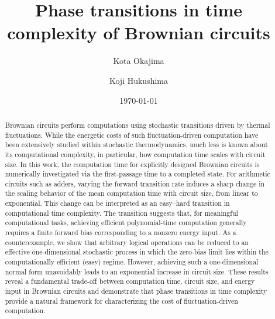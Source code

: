 \documentclass[%
 reprint,
superscriptaddress,
 amsmath,amssymb,
 aps,
 prx,
]{revtex4-2}
\begin{document}

\title{Phase transitions in time complexity of Brownian circuits}

\author{Kota Okajima}
\address{
 Graduate School of Arts and Sciences,
 The University of Tokyo,
 Komaba, Meguro-ku, Tokyo 153-8902, Japan
}

\author{Koji Hukushima}
\address{
 Graduate School of Arts and Sciences,
 The University of Tokyo,
 Komaba, Meguro-ku, Tokyo 153-8902, Japan
}
\address{
Komaba Institute for Science, The
University of Tokyo, 3-8-1 Komaba, Meguro-ku, Tokyo 153-8902, Japan
}

\date{\today}%

\begin{abstract}
Brownian circuits perform computations using stochastic transitions driven by thermal fluctuations. While the energetic costs of such fluctuation-driven computation have been extensively studied within stochastic thermodynamics, much less is known about its computational complexity, in particular, how computation time scales with circuit size. 
In this work, the computation time for explicitly designed Brownian circuits is numerically investigated via the first-passage time to a completed state. For arithmetic circuits such as adders, varying the forward transition rate induces a sharp change in the scaling behavior of the mean computation time with circuit size, from linear to exponential. This change can be interpreted as an easy--hard transition in computational time complexity. The transition suggests that, for meaningful computational tasks, achieving efficient polynomial-time computation generally requires a finite forward bias corresponding to a nonzero energy input. As a counterexample, we show that arbitrary logical operations can be reduced to an effective one-dimensional stochastic process in which the zero-bias limit lies within the computationally efficient (easy) regime. However, achieving such a one-dimensional normal form unavoidably leads to an exponential increase in circuit size. These results reveal a fundamental trade-off between computation time, circuit size, and energy input in Brownian circuits and demonstrate that phase transitions in time complexity provide a natural framework for characterizing the cost of fluctuation-driven computation. 
\end{abstract}

\maketitle
\end{document}
